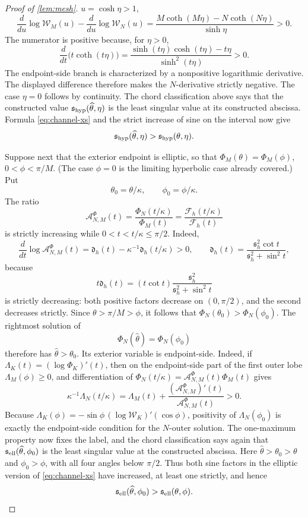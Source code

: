 \documentclass[review,hidelinks,onefignum,onetabnum]{siamart251216}
\begin{document}
\begin{proof}[Proof of \cref{lem:mesh}]
\(u=\cosh\eta>1\),
\[
 \frac{d}{du}\log\mathcal W_M(u)-
 \frac{d}{du}\log\mathcal W_N(u)
 =\frac{M\coth(M\eta)-N\coth(N\eta)}{\sinh\eta}>0.
\]
The numerator is positive because, for \(\eta>0\),
\[
 \frac{d}{dt}\bigl(t\coth(t\eta)\bigr)
 =\frac{\sinh(t\eta)\cosh(t\eta)-t\eta}{\sinh^2(t\eta)}>0.
\]
The endpoint-side branch is characterized by a nonpositive logarithmic
derivative.  The displayed difference therefore makes the
\(N\)-derivative strictly negative.  The case \(\eta=0\) follows by
continuity.
The chord classification above says that the constructed value
\(\mathfrak s_{\rm hyp}(\widehat\theta,\eta)\) is the least singular
value at its constructed abscissa.  Formula
\eqref{eq:channel-xs} and the strict increase of sine on the interval
now give
\begin{equation}\label{eq:hyper-height-increase}
 \mathfrak s_{\rm hyp}(\widehat\theta,\eta)
 >\mathfrak s_{\rm hyp}(\theta,\eta).
\end{equation}

Suppose next that the exterior endpoint is elliptic, so that
\(\Phi_M(\theta)=\Phi_M(\phi)\), \(0<\phi<\pi/M\).  (The case
\(\phi=0\)
is the limiting hyperbolic case already covered.)  Put
\[
 \theta_0=\theta/\kappa,\qquad \phi_0=\phi/\kappa.
\]
The ratio
\[
 \mathcal A_{N,M}^{\Phi}(t)
 =\frac{\Phi_N(t/\kappa)}{\Phi_M(t)}
 =\frac{\mathcal F_h(t/\kappa)}{\mathcal F_h(t)}
\]
is strictly increasing while \(0<t<t/\kappa\leq\pi/2\).  Indeed,
\[
 \frac{d}{dt}\log\mathcal A_{N,M}^{\Phi}(t)
 =\mathfrak d_h(t)-\kappa^{-1}\mathfrak d_h(t/\kappa)>0,\qquad
 \mathfrak d_h(t)=\frac{\mathfrak s_h^2\cot t}
 {\mathfrak s_h^2+\sin^2t},
\]
because
\[
 t\mathfrak d_h(t)=(t\cot t)
 \frac{\mathfrak s_h^2}{\mathfrak s_h^2+\sin^2t}
\]
is strictly decreasing: both positive factors decrease on
\((0,\pi/2)\), and the second decreases strictly.  Since
\(\theta>\pi/M>\phi\), it follows that
\(\Phi_N(\theta_0)>\Phi_N(\phi_0)\).  The rightmost solution of
\[
 \Phi_N(\widehat\theta)=\Phi_N(\phi_0)
\]
therefore has \(\widehat\theta>\theta_0\).  Its exterior variable is
endpoint-side.  Indeed, if
\(\Lambda_K(t)=(\log\Phi_K)'(t)\), then on the
endpoint-side part of the first outer lobe
\(\Lambda_M(\phi)\geq0\), and differentiation of
\(\Phi_N(t/\kappa)=\mathcal A_{N,M}^{\Phi}(t)\Phi_M(t)\) gives
\[
 \kappa^{-1}\Lambda_N(t/\kappa)
 =\Lambda_M(t)
 +\frac{(\mathcal A_{N,M}^{\Phi})'(t)}{\mathcal A_{N,M}^{\Phi}(t)}>0.
\]
Because
\(\Lambda_K(\phi)=-\sin\phi\,(\log\mathcal W_K)'(\cos\phi)\),
positivity of \(\Lambda_N(\phi_0)\) is exactly the endpoint-side
condition for the
\(N\)-outer solution.  The one-maximum property now fixes the label, and the chord
classification says again that
\(\mathfrak s_{\rm ell}(\widehat\theta,\phi_0)\) is the least singular
value at the constructed abscissa.  Here
\(\widehat\theta>\theta_0>\theta\) and \(\phi_0>\phi\), with all four
angles below \(\pi/2\).  Thus both sine factors in the elliptic version
of \eqref{eq:channel-xs} have increased, at least one strictly, and hence
\begin{equation}\label{eq:elliptic-height-increase}
 \mathfrak s_{\rm ell}(\widehat\theta,\phi_0)
 >\mathfrak s_{\rm ell}(\theta,\phi).
\end{equation}


\end{proof}
\end{document}

